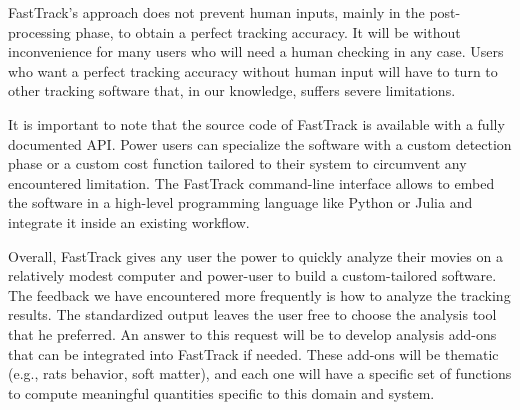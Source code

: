     FastTrack's approach does not prevent human inputs, mainly in the post-processing phase, to obtain a perfect tracking accuracy. It will be without inconvenience for many users who will need a human checking in any case. Users who want a perfect tracking accuracy without human input will have to turn to other tracking software that, in our knowledge, suffers severe limitations.

    It is important to note that the source code of FastTrack is available with a fully documented API. Power users can specialize the software with a custom detection phase or a custom cost function tailored to their system to circumvent any encountered limitation. The FastTrack command-line interface allows to embed the software in a high-level programming language like Python or Julia and integrate it inside an existing workflow.

    Overall, FastTrack gives any user the power to quickly analyze their movies on a relatively modest computer and power-user to build a custom-tailored software. The feedback we have encountered more frequently is how to analyze the tracking results. The standardized output leaves the user free to choose the analysis tool that he preferred. An answer to this request will be to develop analysis add-ons that can be integrated into FastTrack if needed. These add-ons will be thematic (e.g., rats behavior, soft matter), and each one will have a specific set of functions to compute meaningful quantities specific to this domain and system.

